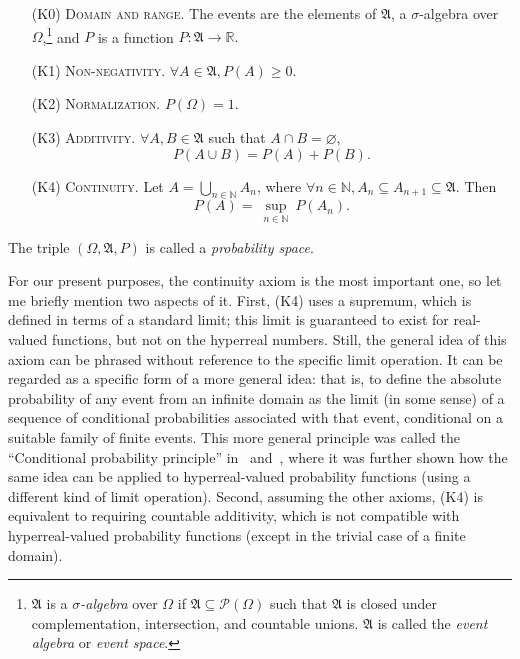 \begin{itemize}
\item[(K0)] \textsc{Domain and range.} The events are the elements of $\mathfrak{A}$, a $\sigma$-algebra over $\Omega$,\footnote{$\mathfrak{A}$ is a \textit{$\sigma$-algebra} over $\Omega$ if $\mathfrak{A} \subseteq \mathcal{P}\left( \Omega \right)$ such that $\mathfrak{A}$ is closed under complementation, intersection, and countable unions. $\mathfrak{A}$ is called the \textit{event algebra} or \textit{event space}.} and $P$ is a function $P:\mathfrak{A} \rightarrow \mathbb{R}.$

\item[(K1)] \textsc{Non-negativity.} $\forall A\in \mathfrak{A}, P(A)\geq 0.$

\item[(K2)] \textsc{Normalization.} $P(\Omega )=1.$

\item[(K3)] \textsc{Additivity.} $\forall A, B \in \mathfrak{A}$ such that $A\cap B=\varnothing$,
$$P(A\cup B)=P(A)+P(B).$$

\item[(K4)] \textsc{Continuity.} Let $ A=\bigcup\limits_{n\in \mathbb{N}}A_{n}$,
where $\forall n\in \mathbb{N},A_{n}\subseteq A_{n+1}\subseteq \mathfrak{A}$. Then
$$ P(A)=\ \underset{n\in \mathbb{N}}{\sup }\ P(A_{n}). $$
\end{itemize}
The triple $(\Omega, \mathfrak{A}, P)$ is called a \textit{probability space}.

For our present purposes, the continuity axiom is the most important one, so let me briefly mention two aspects of it. First, (K4) uses a supremum, which is defined in terms of a standard limit; this limit is guaranteed to exist for real-valued functions, but not on the hyperreal numbers. Still, the general idea of this axiom can be phrased without reference to the specific limit operation. It can be regarded as a specific form of a more general idea: that is, to define the absolute probability of any event from an infinite domain as the limit (in some sense) of a sequence of conditional probabilities associated with that event, conditional on a suitable family of finite events. This more general principle was called the ``Conditional probability principle'' in~\citet[section~3.2]{Benci_etal:2013} and~\citet[section~3.2]{Benci_etal:2018}, where it was further shown how the same idea can be applied to hyperreal-valued probability functions (using a different kind of limit operation).
Second, assuming the other axioms, (K4) is equivalent to requiring countable additivity, which is not compatible with hyperreal-valued probability functions (except in the trivial case of a finite domain).

